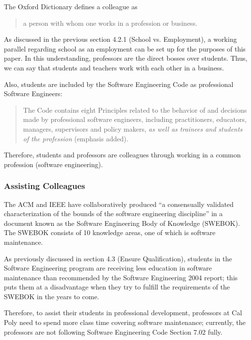 \documentclass[11pt]{article}
\begin{document}
\begin{multicols}{2}
The Oxford Dictionary defines a colleague as

\begin{quote}
a person with whom one works in a profession or business. \cite{definitionColleague}
\end{quote}

As discussed in the previous section 4.2.1 (School vs. Employment), a working parallel regarding school as an employment can be set up for the purposes of this paper.  In this understanding, professors are the direct bosses over students.  Thus, we can say that students and teachers work with each other in a business.

Also, students are included by the Software Engineering Code as professional Software Engineers:

\begin{quote}
The Code contains eight Principles related to the behavior of and decisions made by professional software engineers, including practitioners, educators, managers, supervisors and policy makers, \emph{as well as trainees and students of the profession} (emphasis added). \cite{secode}
\end{quote}

Therefore, students and professors are colleagues through working in a common profession (software engineering).

\subsubsection{Assisting Colleagues}

The ACM and IEEE have collaboratively produced ``a consensually validated characterization of the bounds of the software engineering discipline'' in a document known as the Software Engineering Body of Knowledge (SWEBOK). \cite{swebok}  The SWEBOK consists of 10 knowledge areas, one of which is software maintenance. \cite{swebok}

As previously discussed in section 4.3 (Ensure Qualification), students in the Software Engineering program are receiving less education in software maintenance than recommended by the Software Engineering 2004 report; this puts them at a disadvantage when they try to fulfill the requirements of the SWEBOK in the years to come.

Therefore, to assist their students in professional development, professors at Cal Poly need to spend more class time covering software maintenance; currently, the professors are not following Software Engineering Code Section 7.02 fully.



\end{multicols}
\end{document}
